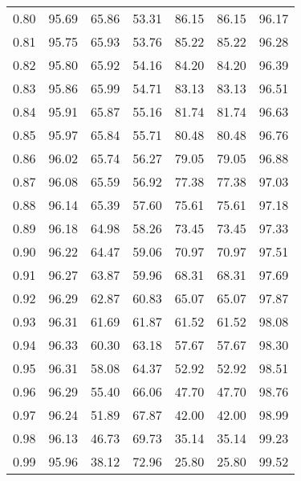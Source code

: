 \begin{tabular}{|c|c|c|c|c|c|c|}
      0.80 &     95.69 &     65.86 &      53.31 &   86.15 &      86.15 &         96.17 \\
      0.81 &     95.75 &     65.93 &      53.76 &   85.22 &      85.22 &         96.28 \\
      0.82 &     95.80 &     65.92 &      54.16 &   84.20 &      84.20 &         96.39 \\
      0.83 &     95.86 &     65.99 &      54.71 &   83.13 &      83.13 &         96.51 \\
      0.84 &     95.91 &     65.87 &      55.16 &   81.74 &      81.74 &         96.63 \\
      0.85 &     95.97 &     65.84 &      55.71 &   80.48 &      80.48 &         96.76 \\
      0.86 &     96.02 &     65.74 &      56.27 &   79.05 &      79.05 &         96.88 \\
      0.87 &     96.08 &     65.59 &      56.92 &   77.38 &      77.38 &         97.03 \\
      0.88 &     96.14 &     65.39 &      57.60 &   75.61 &      75.61 &         97.18 \\
      0.89 &     96.18 &     64.98 &      58.26 &   73.45 &      73.45 &         97.33 \\
      0.90 &     96.22 &     64.47 &      59.06 &   70.97 &      70.97 &         97.51 \\
      0.91 &     96.27 &     63.87 &      59.96 &   68.31 &      68.31 &         97.69 \\
      0.92 &     96.29 &     62.87 &      60.83 &   65.07 &      65.07 &         97.87 \\
      0.93 &     96.31 &     61.69 &      61.87 &   61.52 &      61.52 &         98.08 \\
      0.94 &     96.33 &     60.30 &      63.18 &   57.67 &      57.67 &         98.30 \\
      0.95 &     96.31 &     58.08 &      64.37 &   52.92 &      52.92 &         98.51 \\
      0.96 &     96.29 &     55.40 &      66.06 &   47.70 &      47.70 &         98.76 \\
      0.97 &     96.24 &     51.89 &      67.87 &   42.00 &      42.00 &         98.99 \\
      0.98 &     96.13 &     46.73 &      69.73 &   35.14 &      35.14 &         99.23 \\
      0.99 &     95.96 &     38.12 &      72.96 &   25.80 &      25.80 &         99.52 \\
\bottomrule
\end{tabular}
